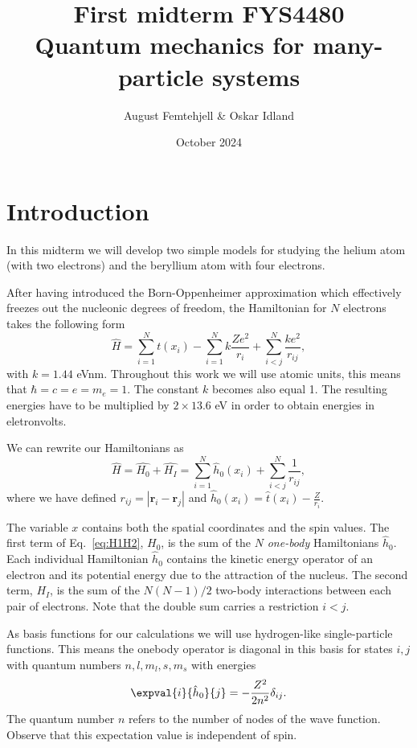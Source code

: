 \documentclass{article}
\title{
    First midterm FYS4480\\
    Quantum mechanics for many-particle systems
}
\author{August Femtehjell \& Oskar Idland}
\date{October 2024}
\begin{document}
\maketitle

\section*{Introduction}

In this midterm we will develop two simple models for studying the helium atom (with two electrons) and the beryllium atom with four electrons.

After having introduced the  Born-Oppenheimer approximation which effectively freezes out the nucleonic degrees of freedom, the Hamiltonian for \(N\) electrons takes the following form
\begin{equation*}
    \hat{H} = \sum_{i=1}^{N} t(x_i) - \sum_{i=1}^{N} k\frac{Ze^2}{r_i} + \sum_{i<j}^{N} \frac{ke^2}{r_{ij}},
\end{equation*}
with \(k=1.44\) eVnm.
Throughout this work we will use atomic units, this means that \(\hbar = c = e = m_e = 1\).
The constant \(k\) becomes also equal 1.
The resulting energies have to be multiplied by \(2 \times 13.6\) eV in order to obtain energies in eletronvolts.

We can rewrite our Hamiltonians as
\begin{equation}
    \hat{H} = \hat{H_0} + \hat{H_I}
    = \sum_{i=1}^{N}\hat{h}_0(x_i) + \sum_{i<j}^{N}\frac{1}{r_{ij}},
    \label{eq:H1H2}
\end{equation}
where  we have defined \(r_{ij} = |\boldsymbol{r}_i - \boldsymbol{r}_j|\) and \(\hat{h}_0(x_i) =  \hat{t}(x_i) - \frac{Z}{r_i}\).

The variable \(x\) contains both the spatial coordinates and the spin values.
The first term of Eq.~\eqref{eq:H1H2}, \(H_0\), is the sum of the \(N\) \emph{one-body} Hamiltonians \(\hat{h}_0\).
Each individual Hamiltonian \(\hat{h}_0\) contains the kinetic energy operator of an electron and its potential energy due to the attraction of the nucleus.
The second term, \(H_I\), is the sum of the \(N(N-1)/2\) two-body interactions between each pair of electrons.
Note that the double sum carries a restriction \(i<j\).

As basis functions for our calculations we will use hydrogen-like single-particle functions.
This means the onebody operator is diagonal in this basis for states \(i,j\) with quantum numbers
\(n,l,m_l,s,m_s\) with energies
\begin{equation}
    \expval{i}{\hat{h}_0}{j} = -\frac{Z^2}{2n^2}\delta_{ij}.
    \label{eq:onebody}
\end{equation}
The quantum number \(n\) refers to the number of nodes of the wave function.
Observe that this expectation value is independent of spin.
\end{document}
